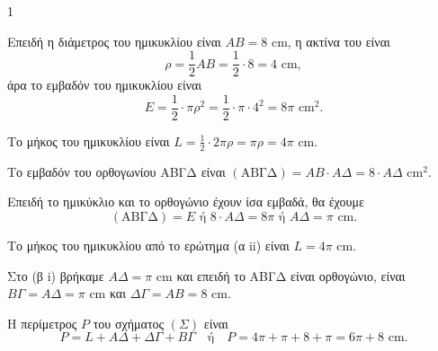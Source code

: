 \begin{ylh}{1}
    \item [ΛΥΣΗ]
    \begin{alist}
        \item 
        \begin{rlist}
            \item Επειδή η διάμετρος του ημικυκλίου είναι $AB = 8 \text{ cm}$, η ακτίνα του είναι
            \[ \rho = \frac{1}{2} AB = \frac{1}{2} \cdot 8 = 4 \text{ cm}, \]
            άρα το εμβαδόν του ημικυκλίου είναι
            \[ E = \frac{1}{2} \cdot \pi\rho^2 = \frac{1}{2} \cdot \pi \cdot 4^2 = 8\pi \text{ cm}^2. \]
            \item Το μήκος του ημικυκλίου είναι $L = \frac{1}{2} \cdot 2\pi\rho = \pi\rho = 4\pi \text{ cm}$.
        \end{rlist}
        \item 
        \begin{rlist}
            \item Το εμβαδόν του ορθογωνίου ΑΒΓΔ είναι $(\text{ΑΒΓΔ}) = AB \cdot ΑΔ = 8 \cdot ΑΔ \text{ cm}^2$.
            
            Επειδή το ημικύκλιο και το ορθογώνιο έχουν ίσα εμβαδά, θα έχουμε
            \[ (\text{ΑΒΓΔ}) = E \text{ ή } 8 \cdot ΑΔ = 8\pi \text{ ή } ΑΔ = \pi \text{ cm}. \]
            \item Το μήκος του ημικυκλίου από το ερώτημα (α ii) είναι $L = 4\pi \text{ cm}$.
            
            Στο (β i) βρήκαμε $ΑΔ = \pi \text{ cm}$ και επειδή το ΑΒΓΔ είναι ορθογώνιο, είναι $ΒΓ = ΑΔ = \pi \text{ cm}$ και $ΔΓ = AB = 8 \text{ cm}$.
            
            Η περίμετρος $P$ του σχήματος $(\Sigma)$ είναι
            \[ P = L + ΑΔ + ΔΓ + ΒΓ \quad \text{ή} \quad P = 4\pi + \pi + 8 + \pi = 6\pi + 8 \text{ cm}. \]
        \end{rlist}
    \end{alist}
\end{ylh}